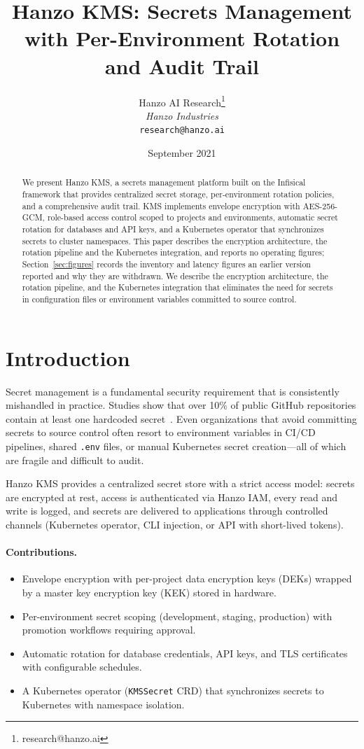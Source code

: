 \documentclass[11pt,twocolumn]{article}
\title{Hanzo KMS: Secrets Management with Per-Environment Rotation and Audit Trail}
\author{Hanzo AI Research\thanks{research@hanzo.ai} \\ \textit{Hanzo Industries} \\ \texttt{research@hanzo.ai}}
\date{September 2021}
\begin{document}
\hanzocoverpage

\begin{abstract}
We present Hanzo KMS, a secrets management platform built on the Infisical framework that provides centralized secret storage, per-environment rotation policies, and a comprehensive audit trail. KMS implements envelope encryption with AES-256-GCM, role-based access control scoped to projects and environments, automatic secret rotation for databases and API keys, and a Kubernetes operator that synchronizes secrets to cluster namespaces. This paper describes the encryption architecture, the rotation pipeline and the Kubernetes integration, and reports no operating figures; Section~\ref{sec:figures} records the inventory and latency figures an earlier version reported and why they are withdrawn. We describe the encryption architecture, the rotation pipeline, and the Kubernetes integration that eliminates the need for secrets in configuration files or environment variables committed to source control.
\end{abstract}

\section{Introduction}

Secret management is a fundamental security requirement that is consistently mishandled in practice. Studies show that over 10\% of public GitHub repositories contain at least one hardcoded secret~\cite{meli2019}. Even organizations that avoid committing secrets to source control often resort to environment variables in CI/CD pipelines, shared \texttt{.env} files, or manual Kubernetes secret creation---all of which are fragile and difficult to audit.

Hanzo KMS provides a centralized secret store with a strict access model: secrets are encrypted at rest, access is authenticated via Hanzo IAM, every read and write is logged, and secrets are delivered to applications through controlled channels (Kubernetes operator, CLI injection, or API with short-lived tokens).

\paragraph{Contributions.}
\begin{itemize}
    \item Envelope encryption with per-project data encryption keys (DEKs) wrapped by a master key encryption key (KEK) stored in hardware.
    \item Per-environment secret scoping (development, staging, production) with promotion workflows requiring approval.
    \item Automatic rotation for database credentials, API keys, and TLS certificates with configurable schedules.
    \item A Kubernetes operator (\texttt{KMSSecret} CRD) that synchronizes secrets to Kubernetes with namespace isolation.
\end{itemize}
\end{document}
